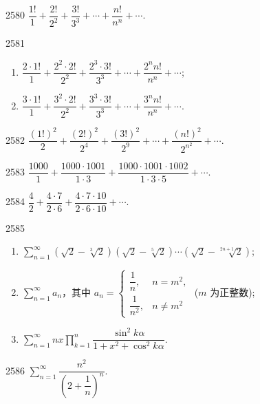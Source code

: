 \begin{prob}[S]{2580}
$\dfrac{1!}{1} + \dfrac{2!}{2^2} + \dfrac{3!}{3^3} + \cdots + \dfrac{n!}{n^n} + \cdots$.
\end{prob}

\begin{prob}[M]{2581}
\begin{enumerate}[label=(\alph*), itemsep=2pt, topsep=3pt]
  \item $\dfrac{2 \cdot 1!}{1} + \dfrac{2^2 \cdot 2!}{2^2} + \dfrac{2^3 \cdot 3!}{3^3} + \cdots + \dfrac{2^n n!}{n^n} + \cdots$;
  \item $\dfrac{3 \cdot 1!}{1} + \dfrac{3^2 \cdot 2!}{2^2} + \dfrac{3^3 \cdot 3!}{3^3} + \cdots + \dfrac{3^n n!}{n^n} + \cdots$.
\end{enumerate}
\end{prob}

\begin{prob}[S]{2582}
$\dfrac{(1!)^2}{2} + \dfrac{(2!)^2}{2^4} + \dfrac{(3!)^2}{2^9} + \cdots + \dfrac{(n!)^2}{2^{n^2}} + \cdots$.
\end{prob}

\begin{prob}[S]{2583}
$\dfrac{1000}{1} + \dfrac{1000 \cdot 1001}{1 \cdot 3} + \dfrac{1000 \cdot 1001 \cdot 1002}{1 \cdot 3 \cdot 5} + \cdots$.
\end{prob}

\begin{prob}[S]{2584}
$\dfrac{4}{2} + \dfrac{4 \cdot 7}{2 \cdot 6} + \dfrac{4 \cdot 7 \cdot 10}{2 \cdot 6 \cdot 10} + \cdots$.
\end{prob}

\begin{prob}[L]{2585}
\begin{enumerate}[label=(\alph*), itemsep=2pt, topsep=3pt]
  \item $\sum_{n=1}^{\infty} (\sqrt{2} - \sqrt[3]{2})(\sqrt{2} - \sqrt[5]{2}) \cdots (\sqrt{2} - \sqrt[2n+1]{2})$;
  \item $\sum_{n=1}^{\infty} a_n$，其中 $a_n = \begin{cases} \dfrac{1}{n}, & n = m^2, \\ \dfrac{1}{n^2}, & n \neq m^2 \end{cases}$ ($m$ 为正整数);
  \item $\sum_{n=1}^{\infty} nx \prod_{k=1}^{n} \dfrac{\sin^2 k\alpha}{1 + x^2 + \cos^2 k\alpha}$.
\end{enumerate}
\end{prob}

\begin{prob}[S]{2586}
$\sum_{n=1}^{\infty} \dfrac{n^2}{\left(2 + \dfrac{1}{n}\right)^n}$.
\end{prob}

